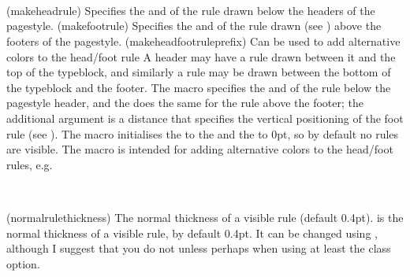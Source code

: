 \begin{syntax}
\cmd{\makeheadrule} \\
\cmd{\makefootrule} \\
\cmd{\makeheadfootruleprefix}\\
\end{syntax}
\glossary(makeheadrule)%
  {}%
  {Specifies the  and  of the rule drawn below the
   headers of the  pagestyle.}%
\glossary(makefootrule)%
  {}%
  {Specifies the  and  of the rule drawn 
   (see ) above the footers of the
   pagestyle.}%
\glossary(makeheadfootruleprefix)
{}%
{Can be used to add alternative colors to the head/foot rule}%
A header may have a rule drawn between it and the top of 
the typeblock, and similarly a rule may be drawn 
between the bottom of the typeblock and the 
footer. 
The \cmd{\makeheadrule} macro specifies the 
and  of the rule below the  pagestyle 
header, and the \cmd{\makefootrule} does the same for 
the rule above the footer; the
additional  argument is a distance that specifies the vertical
positioning of the foot rule (see \cmd{\footruleskip}).
The \cmd{\makepagestyle} macro initialises the  to the 
\lnc{\textwidth} and the  to 0pt, so by default no rules
are visible. The macro \cmd{\makeheadfootruleprefix} is intended for
adding alternative colors to the head/foot rules, e.g.
\begin{lcode}
\end{lcode}


\begin{syntax}
\lnc{\normalrulethickness} \\
\end{syntax}
\glossary(normalrulethickness)%
  {}%
  {The normal thickness of a visible rule (default 0.4pt).}
\lnc{\normalrulethickness} is the normal 
thickness of a visible rule, by 
default 0.4pt. It can be changed using \cmd{\setlength}, although I suggest 
that you do not unless perhaps when using at least the \Lopt{14pt} class 
option. 

